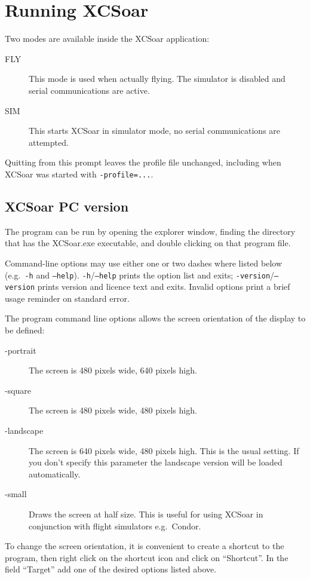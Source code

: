 \section{Running XCSoar}

Two modes are available inside the XCSoar application: 
\begin{description}
\item[FLY] This mode is used when actually flying.  The simulator is 
  disabled and serial communications are active. 
\item[SIM] This starts XCSoar in simulator mode, no serial communications
  are attempted.
\end{description}
Quitting from this prompt leaves the profile file unchanged, including
when XCSoar was started with \verb|-profile=...|.

\subsection*{XCSoar PC version}
The program can be run by opening the explorer window, finding the directory
that has the XCSoar.exe executable, and double clicking on that program file.

Command-line options may use either one or two dashes where listed below (e.g.\
\texttt{-h} and \texttt{--help}).
\texttt{-h}/\texttt{--help} prints the option list and exits;
\texttt{-version}/\texttt{--version} prints version and licence text and exits.
Invalid options print a brief usage reminder on standard error.

The program command line options allows the screen orientation of
the display to be defined:
\begin{description}
\item[-portrait] The screen is 480 pixels wide, 640 pixels high.
\item[-square] The screen is 480 pixels wide, 480 pixels high.
\item[-landscape] The screen is 640 pixels wide, 480 pixels high. This is the
usual setting. If you don't specify this parameter the landscape version will be
loaded automatically.
\item[-small] Draws the screen at half size.  This is useful for using XCSoar in
 conjunction with flight simulators e.g.\ Condor.
\end{description}
To change the screen orientation, it is convenient to create a shortcut to the
program, then right click on the shortcut icon and click on ``Shortcut''. 
In the field ``Target'' add one of the desired options listed above.

